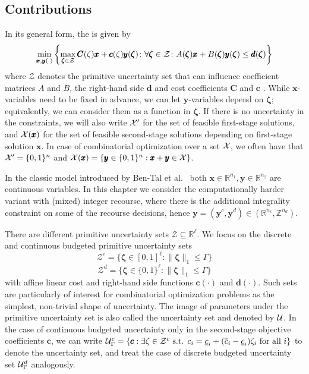 \subsection{Contributions}

In its general form, the  is given by
\[ \min_{\pmb{x},\pmb{y}(\cdot)}  \left\{ \max_{\pmb{\zeta} \in \mathcal{Z}} \pmb{C}(\zeta)\pmb{x} + \pmb{c}(\zeta)\pmb{y}(\pmb{\zeta})  \colon \forall \pmb{\zeta} \in \mathcal{Z} \colon A(\pmb{\zeta}) \pmb{x} + B(\pmb{\zeta})\pmb{y}(\pmb{\zeta}) \leq \pmb{d}(\pmb{\zeta})  \right\} \]
where $\mathcal{Z}$ denotes the primitive uncertainty set that can influence coefficient matrices $A$ and $B$, the right-hand side $\pmb{d}$ and cost coefficients $\pmb{C}$ and $\pmb{c}$ . While $\pmb{x}$-variables need to be fixed in advance, we can let $\pmb{y}$-variables depend on $\pmb{\zeta}$; equivalently, we can consider them as a function in $\pmb{\zeta}$. If there is no uncertainty in the constraints, we will also write $\mathcal{X}'$ for the set of feasible first-stage solutions, and $\mathcal{X}(\pmb{x})$ for the set of feasible second-stage solutions depending on first-stage solution $\pmb{x}$. In case of combinatorial optimization over a set $\mathcal{X}$, we often have that $\mathcal{X}'=\{0,1\}^n$ and $\mathcal{X}(\pmb{x}) = \{ \pmb{y}\in\{0,1\}^n : \pmb{x}+\pmb{y} \in\mathcal{X}\}$.

In the classic model introduced by Ben-Tal et al.~\cite{ben2004adjustable} both $\pmb{x} \in \mathbb{R}^{n_1}, \pmb{y} \in \mathbb{R}^{n_2}$ are continuous variables.
In this chapter we consider the computationally harder variant with (mixed) integer recourse, where there is the additional integrality constraint on some of the recourse decisions, hence $\pmb{y} = (\pmb{y}^c, \pmb{y}^{d}) \in (\mathbb{R}^{n_c}, \mathbb{Z}^{n_d})$.

There are different primitive uncertainty sets $\mathcal{Z} \subseteq \mathbb{R}^{\ell}$.
We focus on the discrete and continuous budgeted primitive uncertainty sets
\[ \mathcal{Z}^c =  \{ \pmb{\zeta} \in [0,1]^{\ell} \colon \| \pmb{\zeta} \|_1 \leq \Gamma \} \]
\[ \mathcal{Z}^d =  \{ \pmb{\zeta} \in \{0,1\}^{\ell} \colon \| \pmb{\zeta} \|_1 \leq \Gamma \} \]
with affine linear cost and right-hand side functions $\pmb{c}(\cdot)$ and $\pmb{d}(\cdot)$. Such sets are particularly of interest for combinatorial optimization problems as the simplest, non-trivial shape of uncertainty. The image of parameters under the primitive uncertainty set is also called the uncertainty set and denoted by $\mathcal{U}$. In the case of continuous budgeted uncertainty only in the second-stage objective coefficients $\pmb{c}$, we can write $\mathcal{U}^c_\Gamma = \{\pmb{c} : \exists \zeta \in \mathcal{Z}^c \text{ s.t. } c_i = \underline{c}_i + (\overline{c}_i - \underline{c}_i)\zeta_i \text{ for all } i\}$ to denote the uncertainty set, and treat the case of discrete budgeted uncertainty set $\mathcal{U}^d_\Gamma$ analogously.

